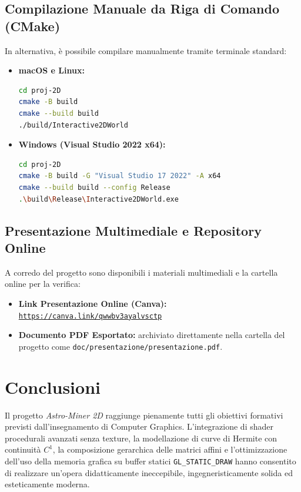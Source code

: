 \documentclass[11pt,a4paper]{article}
\begin{document}
\subsection{Compilazione Manuale da Riga di Comando (CMake)}
In alternativa, è possibile compilare manualmente tramite terminale standard:
\begin{itemize}
    \item \textbf{macOS e Linux:}
\begin{lstlisting}[language=bash]
cd proj-2D
cmake -B build
cmake --build build
./build/Interactive2DWorld
\end{lstlisting}
    \item \textbf{Windows (Visual Studio 2022 x64):}
\begin{lstlisting}[language=bash]
cd proj-2D
cmake -B build -G "Visual Studio 17 2022" -A x64
cmake --build build --config Release
.\build\Release\Interactive2DWorld.exe
\end{lstlisting}
\end{itemize}

\subsection{Presentazione Multimediale e Repository Online}
A corredo del progetto sono disponibili i materiali multimediali e la cartella online per la verifica:
\begin{itemize}
    \item \textbf{Link Presentazione Online (Canva):} \href{https://canva.link/qwwbv3ayalvsctp}{\texttt{https://canva.link/qwwbv3ayalvsctp}}
    \item \textbf{Documento PDF Esportato:} archiviato direttamente nella cartella del progetto come \texttt{doc/presentazione/presentazione.pdf}.
\end{itemize}

\section{Conclusioni}
Il progetto \textit{Astro-Miner 2D} raggiunge pienamente tutti gli obiettivi formativi previsti dall'insegnamento di Computer Graphics. L'integrazione di shader procedurali avanzati senza texture, la modellazione di curve di Hermite con continuità $C^1$, la composizione gerarchica delle matrici affini e l'ottimizzazione dell'uso della memoria grafica su buffer statici \texttt{GL\_STATIC\_DRAW} hanno consentito di realizzare un'opera didatticamente ineccepibile, ingegneristicamente solida ed esteticamente moderna.
\end{document}
